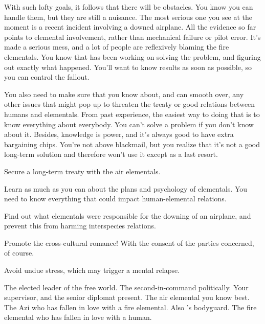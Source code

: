 \documentclass[char]{elementals}
\begin{document}
With such lofty goals, it follows that there will be obstacles.  You know you can handle them, but they are still a nuisance.  The most serious one you see at the moment is a recent incident involving a downed airplane.  All the evidence so far points to elemental involvement, rather than mechanical failure or pilot error.  It's made a serious mess, and a lot of people are reflexively blaming the fire elementals.  You know that \cScientist{} has been working on solving the problem, and figuring out exactly what happened.  You'll want to know \cScientist{\their} results as soon as possible, so you can control the fallout.

You also need to make sure that you know about, and can smooth over, any other issues that might pop up to threaten the treaty or good relations between humans and elementals.  From past experience, the easiest way to doing that is to know everything about everybody.  You can't solve a problem if you don't know about it.  Besides, knowledge is power, and it's always good to have extra bargaining chips.  You're not above blackmail, but you realize that it's not a good long-term solution and therefore won't use it except as a last resort.

\begin{itemz}[Goals]
	\item  Secure a long-term treaty with the air elementals.
	\item  Learn as much as you can about the plans and psychology of elementals.  You need to know everything that could impact human-elemental relations.
	\item  Find out what elementals were responsible for the downing of an airplane, and prevent this from harming interspecies relations.
	\item  Promote the cross-cultural romance!  With the consent of the parties concerned, of course.
	\item  Avoid undue stress, which may trigger a mental relapse.
\end{itemz}

\begin{contacts}
	\contact{\cLeader{}}  The elected leader of the free world.
	\contact{\cDema{}}  The second-in-command politically.
	\contact{\cAvatar{}}  Your supervisor, and the senior diplomat present.
	\contact{\cNaturalist{}}  The air elemental you know best. 
	\contact{\cRomeo{}}  The Azi who has fallen in love with a fire elemental.  Also \cLeader{}'s bodyguard.
	\contact{\cJuliet{}}  The fire elemental who has fallen in love with a human.
\end{contacts}
\end{document}
